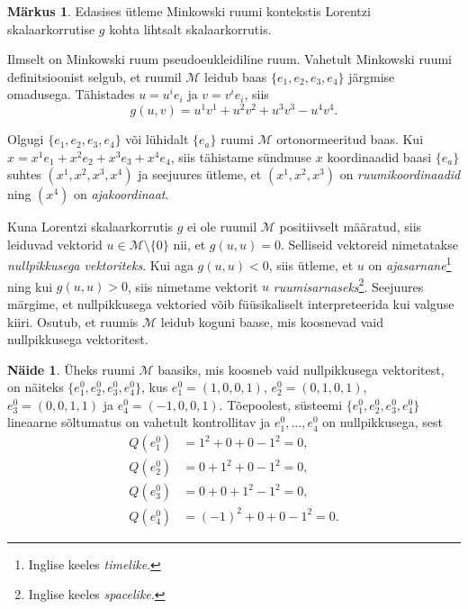 \documentclass[12pt]{article}
\theoremstyle{plain}
\theoremstyle{definition}
\newtheorem{naide}{Näide}[section]
\newtheorem{markus}{Märkus}[section]
\numberwithin{equation}{section}
\def\M{{\mathcal M}}
\begin{document}
\begin{markus}
Edasises ütleme Minkowski ruumi kontekstis Lorentzi skalaarkorrutise 
$g$ kohta lihtsalt skalaarkorrutis.
\end{markus}

Ilmselt on Minkowski ruum pseudoeukleidiline ruum. Vahetult Minkowski 
ruumi definitsioonist selgub, et ruumil $\M$ leidub baas 
$\{e_1, e_2, e_3, e_4\}$ järgmise omadusega. Tähistades 
$u = u^i e_i$ ja $v = v^i e_i$, siis
\[g\left(u, v\right) = u^1 v^1 + u^2 v^2 + u^3 v^3 - u^4 v^4.\]

Olgugi $\{e_1, e_2, e_3, e_4\}$ või lühidalt $\{e_a\}$ ruumi $\M$ 
ortonormeeritud baas. Kui $x = x^1 e_1 + x^2 e_2 + x^3 e_3 + x^4 e_4$, 
siis tähistame sündmuse $x$ koordinaadid baasi $\{e_a\}$ suhtes 
$\left( x^1, x^2, x^3, x^4 \right)$ ja seejuures ütleme, et 
$\left( x^1, x^2, x^3 \right)$ on \emph{ruumikoordinaadid} ning 
$\left(x^4\right)$ on \emph{ajakoordinaat}.

Kuna Lorentzi skalaarkorrutis $g$ ei ole ruumil $\M$ positiivselt 
määratud, siis leiduvad vektorid $u \in \M \setminus \{0\}$ nii, 
et $g \left(u, u\right) = 0$. Selliseid vektoreid nimetatakse 
\emph{nullpikkusega vektoriteks}. Kui aga $g \left(u, u\right) < 0$, 
siis ütleme, et $u$ on \emph{ajasarnane}\footnote{Inglise keeles 
\textit{timelike}.} ning kui $g \left(u, u\right) > 0$, siis nimetame 
vektorit $u$ \emph{ruumisarnaseks}\footnote{Inglise keeles 
\textit{spacelike}.}. Seejuures märgime, et nullpikkusega 
vektoried võib füüsikaliselt interpreteerida kui valguse kiiri.
Osutub, et ruumis $\M$ leidub koguni baase, mis koosnevad 
vaid nullpikkusega vektoritest.

\begin{naide}
Üheks ruumi $\M$ baasiks, mis koosneb vaid nullpikkusega vektoritest, 
on näiteks $\{e_1^0, e_2^0, e_3^0, e_4^0\}$, kus 
$e_1^0 = \left(1, 0, 0, 1\right)$, $e_2^0 = \left(0, 1, 0, 1\right)$, 
$e_3^0 = \left(0, 0, 1, 1\right)$ ja $e_4^0 = 
\left(-1, 0, 0, 1\right).$
Tõepoolest, süsteemi $\{e_1^0, e_2^0, e_3^0, e_4^0\}$ lineaarne 
sõltumatus on vahetult kontrollitav ja $e_1^0, \dots, e_4^0$ on 
nullpikkusega, sest
\begin{align*}
Q\left(e_1^0\right) &= 1^2 + 0 + 0 - 1^2 = 0, \\
Q\left(e_2^0\right) &= 0 + 1^2 + 0 - 1^2 = 0, \\
Q\left(e_3^0\right) &= 0 + 0 + 1^2 - 1^2 = 0, \\
Q\left(e_4^0\right) &= (-1)^2 + 0 + 0 - 1^2 = 0.
\end{align*}
\end{naide}
\end{document}
